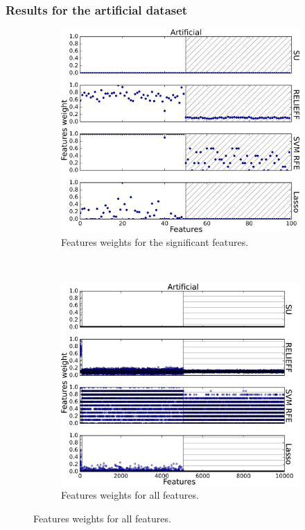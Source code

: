 \documentclass[twoside,11pt]{article}
\begin{document}
\subsubsection{Results for the artificial dataset}
\begin{figure}
  \centering 
  \begin{subfigure}[b]{0.48\textwidth}
      \includegraphics[width=\textwidth]{images/feature_weights_plot_artificial_only_features_bw.png}
      \caption{Features weights for the significant features.}
      \label{fig:feature_weights_plot_artificial_only_features}
  \end{subfigure}
  ~
  \begin{subfigure}[b]{0.48\textwidth}
    \includegraphics[width=\textwidth]{images/feature_weights_plot_artificial_all_bw.png}
      \caption{Features weights for all features.}
      \label{fig:feature_weights_plot_artificial_all}
  \end{subfigure}


\end{figure}
\end{document}
